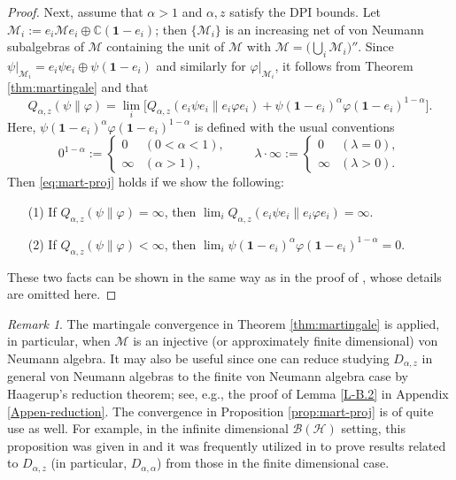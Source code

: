 \documentclass[12pt]{article}
\theoremstyle{definition}
\theoremstyle{remark}
\newtheorem{remark}[theorem]{Remark}
\numberwithin{equation}{section}
\def\Me{\mathcal M}
\def\ffi{\varphi}
\def\1{\mathbf{1}}
\def\bC{\mathbb{C}}
\begin{document}
\begin{proof}
Next, assume that $\alpha>1$ and $\alpha,z$ satisfy the DPI bounds. Let
$\Me_i:=e_i\Me e_i\oplus\bC(\1-e_i)$; then $\{\Me_i\}$ is an increasing net of von Neumann
subalgebras of $\Me$ containing the unit of $\Me$ with $\Me=\bigl(\bigcup_i\Me_i\bigr)''$. Since
$\psi|_{\Me_i}=e_i\psi e_i\oplus\psi(\1-e_i)$ and similarly for $\ffi|_{\Me_i}$, it follows from
Theorem \ref{thm:martingale} and \cite[Theorems 1(ii) and 2(ii)]{kato2023onrenyi} that
\[
Q_{\alpha,z}(\psi\|\ffi)
=\lim_i\bigl[Q_{\alpha,z}(e_i\psi e_i\|e_i\ffi e_i)
+\psi(\1-e_i)^\alpha\ffi(\1-e_i)^{1-\alpha}\bigr].
\]
Here, $\psi(\1-e_i)^\alpha\ffi(\1-e_i)^{1-\alpha}$ is defined with the usual conventions
\[
0^{1-\alpha}:=\begin{cases}0 & (0<\alpha<1), \\ \infty & (\alpha>1),\end{cases}\qquad
\lambda\cdot\infty:=\begin{cases}0 & (\lambda=0), \\ \infty & (\lambda>0).\end{cases}
\]
Then \eqref{eq:mart-proj} holds if we show the following:
\begin{itemize}
\item[(1)] If $Q_{\alpha,z}(\psi\|\ffi)=\infty$, then
$\lim_iQ_{\alpha,z}(e_i\psi e_i\|e_i\ffi e_i)=\infty$.
\item[(2)] If $Q_{\alpha,z}(\psi\|\ffi)<\infty$, then $\lim_i\psi(\1-e_i)^\alpha\ffi(\1-e_i)^{1-\alpha}=0$.
\end{itemize}
These two facts can be shown in the same way as in the proof of \cite[Theorem 4.5]{hiai2018quantum},
whose details are omitted here.
\end{proof}

{\color{blue}
\begin{remark}\label{remark:martingale}
The martingale convergence in Theorem \ref{thm:martingale} is applied, in particular, when $\Me$ is an
injective (or approximately finite dimensional) von Neumann algebra. It may also be useful since one can
reduce studying $D_{\alpha,z}$ in general von Neumann algebras to the finite von Neumann algebra
case by Haagerup's reduction theorem; see, e.g., the proof of Lemma \ref{L-B.2} in Appendix
\ref{Appen-reduction}. The convergence in Proposition \ref{prop:mart-proj} is of quite use as well.
For example, in the infinite dimensional $\mathcal{B}(\mathcal{H})$ setting, this proposition was given in
\cite[Proposition 3.40]{mosonyi2023thestrong} and it was frequently utilized in \cite{mosonyi2023thestrong}
to prove results related to $D_{\alpha,z}$ (in particular, $D_{\alpha,\alpha}$) from those in the finite
dimensional case.
\end{remark}}
\end{document}
